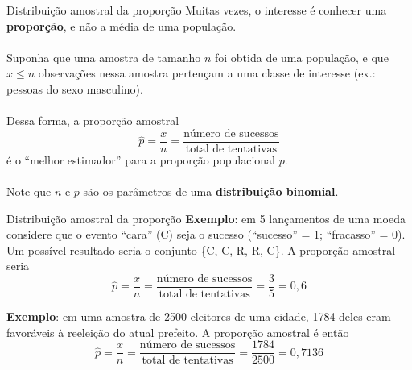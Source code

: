 \documentclass[10pt]{beamer}\usepackage[]{graphicx}\usepackage[]{color}
\theoremstyle{definition}
\begin{document}
\begin{frame}{Distribuição amostral da proporção}
  Muitas vezes, o interesse é conhecer uma \textbf{proporção}, e não a
  média de uma população. \\~\\
  Suponha que uma amostra de tamanho $n$ foi obtida de uma população, e
  que $x \leq n$ observações nessa amostra pertençam a uma classe de
  interesse (ex.: pessoas do sexo masculino). \\~\\
  Dessa forma, a proporção amostral
  \begin{equation*}
    \hat{p} = \frac{x}{n} = \frac{\text{número de sucessos}}{\text{total de
        tentativas}}
  \end{equation*}
  é o ``melhor estimador'' para a proporção populacional $p$. \\~\\
  Note que $n$ e $p$ são os parâmetros de uma \textbf{distribuição
    binomial}.
\end{frame}

\begin{frame}{Distribuição amostral da proporção}
  \textbf{Exemplo}: em 5 lançamentos de uma moeda considere que o evento
  ``cara'' (C) seja o sucesso (``sucesso'' = 1; ``fracasso'' = 0). Um possível
  resultado seria o conjunto \{C, C, R, R, C\}. A proporção
  amostral seria
  \begin{equation*}
    \hat{p} = \frac{x}{n} = \frac{\text{número de sucessos}}{\text{total de
        tentativas}} = \frac{3}{5} = 0,6
  \end{equation*}
  \vspace{1em}

  \textbf{Exemplo}: em uma amostra de 2500 eleitores de uma cidade, 1784
  deles eram favoráveis à reeleição do atual prefeito. A proporção
  amostral é então
  \begin{equation*}
    \hat{p} = \frac{x}{n} = \frac{\text{número de sucessos}}{\text{total de
        tentativas}} = \frac{1784}{2500} = 0,7136
  \end{equation*}
\end{frame}
\end{document}
